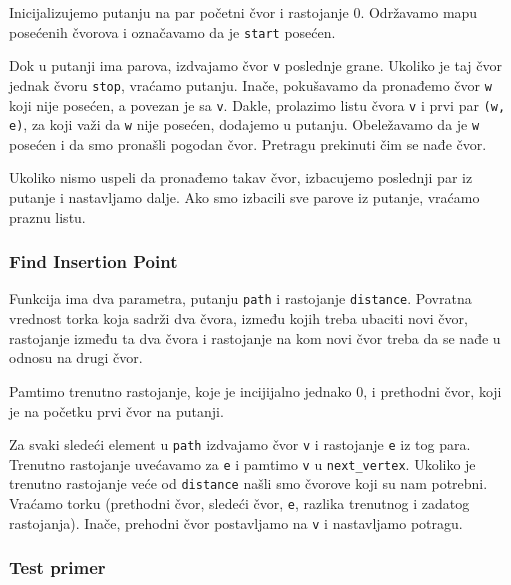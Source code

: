 Inicijalizujemo putanju na par početni čvor i rastojanje 0. Održavamo mapu posećenih čvorova i označavamo da je \texttt{start} posećen. 

Dok u putanji ima parova, izdvajamo čvor \texttt{v} poslednje grane. Ukoliko je taj čvor jednak čvoru \texttt{stop}, vraćamo putanju. Inače, pokušavamo da pronađemo čvor \texttt{w} koji nije posećen, a povezan je sa \texttt{v}. Dakle, prolazimo listu čvora \texttt{v} i prvi par \texttt{(w, e)}, za koji važi da \texttt{w} nije posećen, dodajemo u putanju. Obeležavamo da je \texttt{w} posećen i da smo pronašli pogodan čvor. Pretragu prekinuti čim se nađe čvor. 

Ukoliko nismo uspeli da pronađemo takav čvor, izbacujemo poslednji par iz putanje i nastavljamo dalje. Ako smo izbacili sve parove iz putanje, vraćamo praznu listu.



\subsubsection{Find Insertion Point}
\label{findInsertionPoint}

Funkcija ima dva parametra, putanju \texttt{path} i rastojanje \texttt{distance}. Povratna vrednost torka koja sadrži dva čvora, između kojih treba ubaciti novi čvor, rastojanje između ta dva čvora i rastojanje na kom novi čvor treba da se nađe u odnosu na drugi čvor.

Pamtimo trenutno rastojanje, koje je incijijalno jednako 0, i prethodni čvor, koji je na početku prvi čvor na putanji.

Za svaki sledeći element u \texttt{path} izdvajamo čvor \texttt{v} i rastojanje \texttt{e} iz tog para. Trenutno rastojanje uvećavamo za \texttt{e} i pamtimo \texttt{v} u \texttt{next\_vertex}. Ukoliko je trenutno rastojanje veće od \texttt{distance} našli smo čvorove koji su nam potrebni. Vraćamo torku (prethodni čvor, sledeći čvor, \texttt{e}, razlika trenutnog i zadatog rastojanja). Inače, prehodni čvor postavljamo na \texttt{v} i nastavljamo potragu.







\subsubsection{Test primer}

